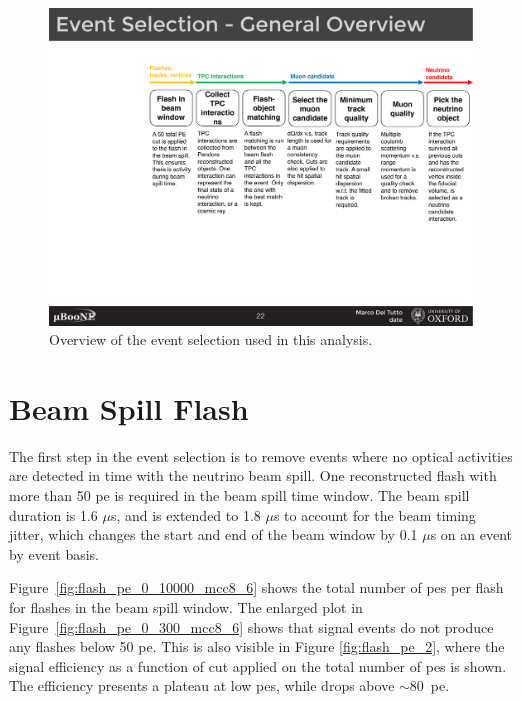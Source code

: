 \begin{figure}[]
\centering
\includegraphics[width=1.0\textwidth]{images/evt_sel_overview}
\caption[Event Selection Overview]{Overview of the event selection used in this analysis.}
\label{fig:evt_sel_overview}
\end{figure}

\section{Beam Spill Flash}
\label{sec:beam_spill}

The first step in the event selection is to remove events where no optical activities are detected in time with the neutrino beam spill. 
One reconstructed flash with more than 50 \acrshort{pe} is required in the beam spill time window. The beam spill duration is 1.6 $\mu$s, and is extended to 1.8 $\mu$s to account for the beam timing jitter, which changes the start and end of the beam window by 0.1 $\mu$s on an event by event basis.

Figure~\ref{fig:flash_pe_0_10000_mcc8_6} shows the total number of \acrshort{pe}s per flash for flashes in the beam spill window. 
The enlarged plot in Figure~\ref{fig:flash_pe_0_300_mcc8_6} shows that signal events do not produce any flashes below 50 \acrshort{pe}. This is also visible in Figure \ref{fig:flash_pe_2}, where the signal efficiency as a function of cut applied on the total number of \acrshort{pe}s is shown. The efficiency presents a plateau at low \acrshort{pe}s, while drops above $\sim80$~\acrshort{pe}.


